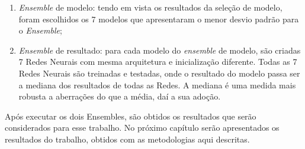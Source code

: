 \begin{enumerate}
    \item\textit{Ensemble} de modelo: tendo em vista os resultados da seleção de modelo, foram escolhidos os 7 modelos que apresentaram o menor desvio padrão para o \textit{Ensemble};
    \item \textit{Ensemble} de resultado: para cada modelo do \textit{ensemble} de modelo, são criadas 7 Redes Neurais com mesma arquitetura e inicialização diferente. Todas as 7 Redes Neurais são treinadas e testadas, onde o resultado do modelo passa ser a mediana dos resultados de todas as Redes. A mediana é uma medida mais robusta a aberrações do que a média, daí a sua adoção.
\end{enumerate}

Após executar os dois Ensembles, são obtidos os resultados que serão considerados para esse trabalho. No próximo capítulo serão apresentados os resultados do trabalho, obtidos com as metodologias aqui descritas.